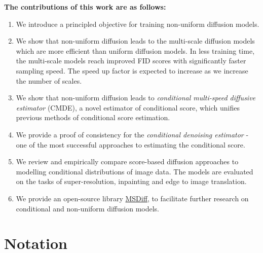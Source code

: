 \noindent
\textbf{The contributions of this work are as follows:}
\begin{enumerate}
    \item We introduce a principled objective for training non-uniform diffusion models.
    \item We show that non-uniform diffusion leads to the multi-scale diffusion models which are more efficient than uniform diffusion models. In less training time, the multi-scale models reach improved FID scores with significantly faster sampling speed. The speed up factor is expected to increase as we increase the number of scales.
    \item We show that non-uniform diffusion leads to \textit{conditional multi-speed diffusive estimator} (CMDE), a novel estimator of conditional score, which unifies previous methods of conditional score estimation.
    \item We provide a proof of consistency for the \textit{conditional denoising estimator} - one of the most successful approaches to estimating the conditional score. 
    
    \item We review and empirically compare score-based diffusion  approaches to modelling conditional distributions of image data. The models are evaluated on the tasks of super-resolution, inpainting and edge to image translation.

    \item We provide an open-source library \href{https://github.com/GBATZOLIS/conditional_score_diffusion}{MSDiff}, to facilitate further research on conditional and non-uniform diffusion models.
\end{enumerate}

\section{Notation}

